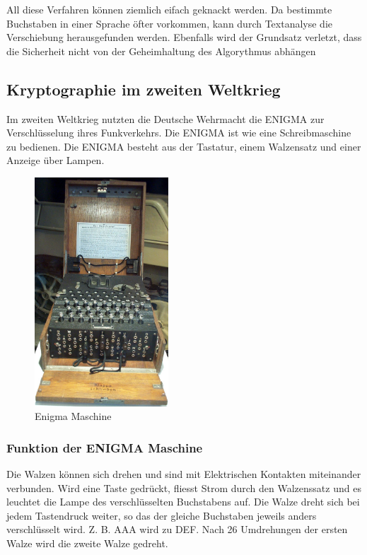 All diese Verfahren können ziemlich eifach geknackt werden. Da bestimmte Buchstaben in einer Sprache öfter vorkommen, kann durch Textanalyse die Verschiebung herausgefunden werden. Ebenfalls wird der Grundsatz verletzt, dass die Sicherheit nicht von der Geheimhaltung
des Algorythmus abhängen 

\subsection{Kryptographie im zweiten Weltkrieg}
Im zweiten Weltkrieg nutzten die Deutsche Wehrmacht die ENIGMA zur Verschlüsselung ihres Funkverkehrs. Die ENIGMA ist wie eine Schreibmaschine zu bedienen. Die ENIGMA besteht aus der Tastatur, einem Walzensatz und einer Anzeige über Lampen. 

\begin{figure}[ht]
\begin{center}
\includegraphics[width=5cm]{images/Enigma_Verkehrshaus_Luzern_cropped.jpg}
\caption{Enigma Maschine}
\end{center}
\end{figure}

\subsubsection{Funktion der ENIGMA Maschine}
Die Walzen können sich drehen und sind mit Elektrischen Kontakten miteinander verbunden. Wird eine Taste gedrückt, fliesst Strom durch den Walzenssatz und es leuchtet die Lampe des verschlüsselten Buchstabens auf. Die Walze dreht sich bei jedem Tastendruck weiter, so das der gleiche Buchstaben jeweils anders verschlüsselt wird. Z. B. AAA wird zu DEF. Nach 26 Umdrehungen der ersten Walze wird die zweite Walze gedreht. \\

